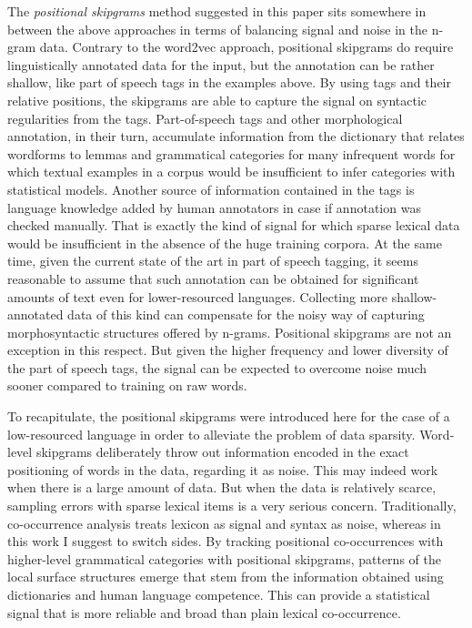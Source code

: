 \documentclass[12pt]{article}
\begin{document}
The \textit{positional skipgrams} method suggested in this paper sits
somewhere in between the above approaches in terms of balancing signal
and noise in the n-gram data. Contrary to the word2vec approach,
positional skipgrams do require linguistically annotated data for the
input, but the annotation can be rather shallow, like part of speech
tags in the examples above.  By using tags and their relative
positions, the skipgrams are able to capture the signal on syntactic
regularities from the tags. Part-of-speech tags and other
morphological annotation, in their turn, accumulate information from
the dictionary that relates wordforms to lemmas and grammatical
categories for many infrequent words for which textual examples in a
corpus would be insufficient to infer categories with statistical
models. Another source of information contained in the tags is
language knowledge added by human annotators in case if annotation was
checked manually. That is exactly the kind of signal for which sparse
lexical data would be insufficient in the absence of the huge training
corpora. At the same time, given the current state of the art in part
of speech tagging, it seems reasonable to assume that such annotation
can be obtained for significant amounts of text even for
lower-resourced languages. Collecting more shallow-annotated data of
this kind can compensate for the noisy way of capturing
morphosyntactic structures offered by n-grams. Positional skipgrams
are not an exception in this respect. But given the higher frequency
and lower diversity of the part of speech tags, the signal can be
expected to overcome noise much sooner compared to training on raw
words.

To recapitulate, the positional skipgrams were introduced here for the
case of a low-resourced language in order to alleviate the problem of
data sparsity. Word-level skipgrams deliberately throw out information
encoded in the exact positioning of words in the data, regarding it as
noise. This may indeed work when there is a large amount of data. But
when the data is relatively scarce, sampling errors with sparse
lexical items is a very serious concern. Traditionally, co-occurrence
analysis treats lexicon as signal and syntax as noise, whereas in this
work I suggest to switch sides. By tracking positional co-occurrences
with higher-level grammatical categories with positional skipgrams,
patterns of the local surface structures emerge that stem from the
information obtained using dictionaries and human language
competence. This can provide a statistical signal that is more
reliable and broad than plain lexical co-occurrence.
\end{document}
